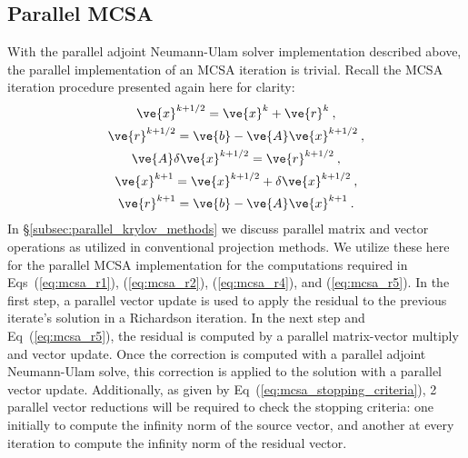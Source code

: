 \documentclass[letterpaper,11pt]{article}
\begin{document}
\subsection{Parallel MCSA}
\label{subsec:parallel_mcsa}
With the parallel adjoint Neumann-Ulam solver implementation described
above, the parallel implementation of an MCSA iteration is
trivial. Recall the MCSA iteration procedure presented again here for
clarity:
\begin{subequations}
  \begin{gather}
    \label{eq:mcsa_r1}
    \ve{x}^{k+1/2} = \ve{x}^k + \ve{r}^k\:,\\
    \label{eq:mcsa_r2}
    \ve{r}^{k+1/2} = \ve{b} - \ve{A}\ve{x}^{k+1/2}\:,\\
    \label{eq:mcsa_r3}
    \ve{A}\delta\ve{x}^{k+1/2} = \ve{r}^{k+1/2}\:,\\
    \label{eq:mcsa_r4}
    \ve{x}^{k+1} = \ve{x}^{k+1/2} + \delta \ve{x}^{k+1/2}\:,\\
    \label{eq:mcsa_r5}
    \ve{r}^{k+1} = \ve{b} - \ve{A}\ve{x}^{k+1}\:.
  \end{gather}
\end{subequations}
In \S\ref{subsec:parallel_krylov_methods} we discuss parallel matrix and
vector operations as utilized in conventional projection methods. We
utilize these here for the parallel MCSA implementation for the
computations required in Eqs~(\ref{eq:mcsa_r1}), (\ref{eq:mcsa_r2}),
(\ref{eq:mcsa_r4}), and (\ref{eq:mcsa_r5}). In the first step, a
parallel vector update is used to apply the residual to the previous
iterate's solution in a Richardson iteration. In the next step and
Eq~(\ref{eq:mcsa_r5}), the residual is computed by a parallel
matrix-vector multiply and vector update. Once the correction is
computed with a parallel adjoint Neumann-Ulam solve, this correction
is applied to the solution with a parallel vector
update. Additionally, as given by
Eq~(\ref{eq:mcsa_stopping_criteria}), 2 parallel vector reductions
will be required to check the stopping criteria: one initially to
compute the infinity norm of the source vector, and another at every
iteration to compute the infinity norm of the residual vector.
\end{document}

